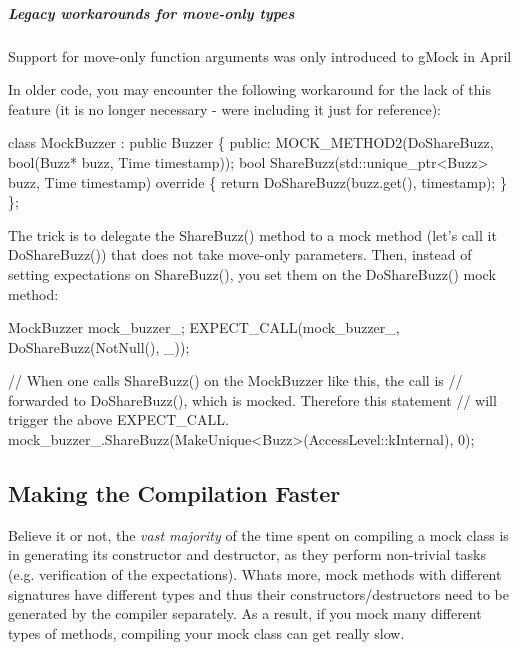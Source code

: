 \subparagraph*{Legacy workarounds for move-\/only types}

Support for move-\/only function arguments was only introduced to g\+Mock in April
\begin{DoxyEnumerate}
\item In older code, you may encounter the following workaround for the lack of this feature (it is no longer necessary -\/ we\textquotesingle{}re including it just for reference)\+:
\end{DoxyEnumerate}


\begin{DoxyCode}
\textcolor{keyword}{class }MockBuzzer : \textcolor{keyword}{public} Buzzer \{
 \textcolor{keyword}{public}:
  MOCK\_METHOD2(DoShareBuzz, \textcolor{keywordtype}{bool}(Buzz* buzz, Time timestamp));
  \textcolor{keywordtype}{bool} ShareBuzz(std::unique\_ptr<Buzz> buzz, Time timestamp)\textcolor{keyword}{ override }\{
    \textcolor{keywordflow}{return} DoShareBuzz(buzz.get(), timestamp);
  \}
\};
\end{DoxyCode}


The trick is to delegate the {\ttfamily Share\+Buzz()} method to a mock method (let’s call it {\ttfamily Do\+Share\+Buzz()}) that does not take move-\/only parameters. Then, instead of setting expectations on {\ttfamily Share\+Buzz()}, you set them on the {\ttfamily Do\+Share\+Buzz()} mock method\+:


\begin{DoxyCode}
MockBuzzer mock\_buzzer\_;
EXPECT\_CALL(mock\_buzzer\_, DoShareBuzz(NotNull(), \_));

\textcolor{comment}{// When one calls ShareBuzz() on the MockBuzzer like this, the call is}
\textcolor{comment}{// forwarded to DoShareBuzz(), which is mocked.  Therefore this statement}
\textcolor{comment}{// will trigger the above EXPECT\_CALL.}
mock\_buzzer\_.ShareBuzz(MakeUnique<Buzz>(AccessLevel::kInternal), 0);
\end{DoxyCode}


\subsection*{Making the Compilation Faster}

Believe it or not, the {\itshape vast majority} of the time spent on compiling a mock class is in generating its constructor and destructor, as they perform non-\/trivial tasks (e.\+g. verification of the expectations). What\textquotesingle{}s more, mock methods with different signatures have different types and thus their constructors/destructors need to be generated by the compiler separately. As a result, if you mock many different types of methods, compiling your mock class can get really slow.

